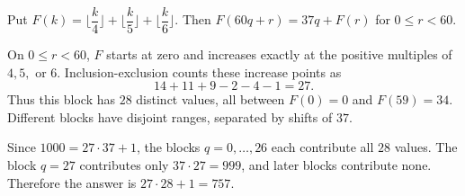 Put $F(k)=\lfloor \dfrac{k}{4}\rfloor+\lfloor \dfrac{k}{5}\rfloor+\lfloor \dfrac{k}{6}\rfloor$. Then $F(60q+r)=37q+F(r)$ for $0\le r<60$.

On $0\le r<60$, $F$ starts at zero and increases exactly at the positive multiples of $4,5,$ or $6$. Inclusion-exclusion counts these increase points as
\[
14+11+9-2-4-1=27.
\]
Thus this block has $28$ distinct values, all between $F(0)=0$ and $F(59)=34$. Different blocks have disjoint ranges, separated by shifts of $37$.

Since $1000=27\cdot37+1$, the blocks $q=0,\ldots,26$ each contribute all $28$ values. The block $q=27$ contributes only $37\cdot27=999$, and later blocks contribute none. Therefore the answer is $\boxed{27\cdot28+1=757}$.
